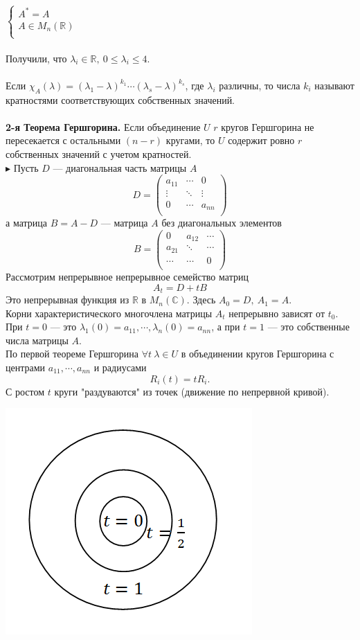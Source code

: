 \documentclass[12pt]{article}
\theoremstyle{definition}
\numberwithin{equation}{section}
\begin{document}
	$
	\left\{
	\begin{array}{lcl}
	A^*=A \\
	A\in M_n(\mathbb{R}) \\
	\end{array}
	\right.
	$\\ \\
	Получили, что $\lambda_i\in \mathbb{R},~0\leqslant\lambda_i\leqslant 4$.\\
	\\
	Если $\chi_A(\lambda)=(\lambda_1-\lambda)^{k_1}\cdots(\lambda_s-\lambda)^{k_s}$, где $\lambda_i$ различны, то числа $k_i$ называют кратностями соответствующих собственных значений.\\ \\
	\textbf{2-я Теорема Гершгорина.} Если объединение $U$ $r$ кругов Гершгорина не пересекается с остальными $(n-r)$ кругами, то $U$ содержит ровно $r$ собственных значений с учетом кратностей.\\
	$\blacktriangleright$ Пусть $D$ --- диагональная часть матрицы $A$
	\[D=\begin{pmatrix}
	a_{11} & \cdots & 0 \\
	\vdots & \ddots & \vdots \\
	0 & \cdots & a_{nn} \\
	\end{pmatrix}\]
	а матрица $B=A-D$ --- матрица $A$ без диагональных элементов 
	\[B=\begin{pmatrix}
	0 & a_{12} & \cdots \\
	a_{21} & \ddots & \cdots \\
	\cdots & \cdots & 0 \\
	\end{pmatrix}\]
	Рассмотрим непрерывное непрерывное семейство матриц $$A_t=D+tB$$
	Это непрерывная функция из $\mathbb{R}$ в $M_n(\mathbb{C})$. Здесь $A_0=D,~A_1=A$.\\
	Корни характеристического многочлена матрицы $A_t$ непрерывно зависят от $t_0$. При $t=0$ --- это $\lambda_1(0)=a_{11},\cdots,\lambda_n(0)=a_{nn}$, а при $t=1$ --- это собственные числа матрицы $A$.\\
	По первой теореме Гершгорина $\forall t~\lambda\in U$ в объединении кругов Гершгорина с центрами $a_{11},\cdots,a_{nn}$ и радиусами $$R_i(t)=tR_i.$$
	С ростом $t$ круги "раздуваются" из точек (движение по непрервной кривой).
	\begin{center}
		\includegraphics[scale=0.8]{l9_4.png}
	\end{center}
\end{document}
